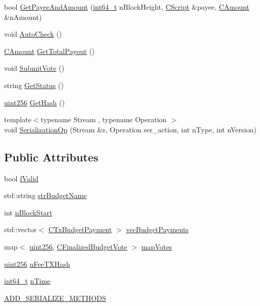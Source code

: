 \begin{DoxyCompactItemize}
\item 
bool \hyperlink{class_c_finalized_budget_a75c6ae33fd0079e732e1103d29501d01}{Get\+Payee\+And\+Amount} (\hyperlink{stdint_8h_adec1df1b8b51cb32b77e5b86fff46471}{int64\+\_\+t} n\+Block\+Height, \hyperlink{class_c_script}{C\+Script} \&payee, \hyperlink{amount_8h_a4eaf3a5239714d8c45b851527f7cb564}{C\+Amount} \&n\+Amount)
\item 
void \hyperlink{class_c_finalized_budget_a88614fdccb5cdf722403c11832df2ad0}{Auto\+Check} ()
\item 
\hyperlink{amount_8h_a4eaf3a5239714d8c45b851527f7cb564}{C\+Amount} \hyperlink{class_c_finalized_budget_a20f2cdac9403d59688b527a98474cc7a}{Get\+Total\+Payout} ()
\item 
void \hyperlink{class_c_finalized_budget_a8d5710eaf0fe541dcdce1d5f2ebee51c}{Submit\+Vote} ()
\item 
string \hyperlink{class_c_finalized_budget_a9a6fbb2d494342fb6d1c48a98d7cc856}{Get\+Status} ()
\item 
\hyperlink{classuint256}{uint256} \hyperlink{class_c_finalized_budget_a0ce6295086247f5982f93ee3cea956e6}{Get\+Hash} ()
\item 
{\footnotesize template$<$typename Stream , typename Operation $>$ }\\void \hyperlink{class_c_finalized_budget_a1bbf758b27a7fb175e2889290f5ef78f}{Serialization\+Op} (Stream \&s, Operation ser\+\_\+action, int n\+Type, int n\+Version)
\end{DoxyCompactItemize}
\subsection*{Public Attributes}
\begin{DoxyCompactItemize}
\item 
bool \hyperlink{class_c_finalized_budget_a00d9e3055bebaaef28543bd67e4ca162}{f\+Valid}
\item 
std\+::string \hyperlink{class_c_finalized_budget_ae2a467abad2985ff3c32b29fc75500aa}{str\+Budget\+Name}
\item 
int \hyperlink{class_c_finalized_budget_a1d04c262e10f4588b17eb3aba5ed9b52}{n\+Block\+Start}
\item 
std\+::vector$<$ \hyperlink{class_c_tx_budget_payment}{C\+Tx\+Budget\+Payment} $>$ \hyperlink{class_c_finalized_budget_a639e7be9254d99deb42aeeb15de63174}{vec\+Budget\+Payments}
\item 
map$<$ \hyperlink{classuint256}{uint256}, \hyperlink{class_c_finalized_budget_vote}{C\+Finalized\+Budget\+Vote} $>$ \hyperlink{class_c_finalized_budget_a756460095ed59fd39e7f3018b4b208dd}{map\+Votes}
\item 
\hyperlink{classuint256}{uint256} \hyperlink{class_c_finalized_budget_a699a2f3cbea723957c2a944b08484bb5}{n\+Fee\+T\+X\+Hash}
\item 
\hyperlink{stdint_8h_adec1df1b8b51cb32b77e5b86fff46471}{int64\+\_\+t} \hyperlink{class_c_finalized_budget_a3bb3cb1d44021d5ef9996a81f3e09734}{n\+Time}
\item 
\hyperlink{class_c_finalized_budget_ad426a5e67867bcb8f73df4aef50ac588}{A\+D\+D\+\_\+\+S\+E\+R\+I\+A\+L\+I\+Z\+E\+\_\+\+M\+E\+T\+H\+O\+D\+S}
\end{DoxyCompactItemize}


